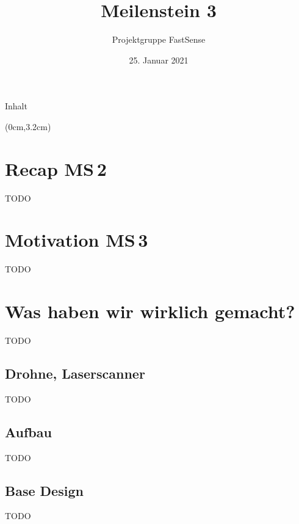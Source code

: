 \documentclass{beamer}
\title{Meilenstein 3}
\author{Projektgruppe FastSense}
\date{25. Januar 2021}
\begin{document}
{
\begin{frame}
\titlepage
\end{frame}}

\begin{frame}{Inhalt}
\tableofcontents
\begin{textblock*}{1cm}(0cm,3.2cm)
\end{textblock*}
\end{frame}

\section{Recap MS\,2}
\begin{frame}{\secname}
TODO
\end{frame}

\section{Motivation MS\,3}
\begin{frame}{\secname}
TODO
\end{frame}

\section{Was haben wir wirklich gemacht?}
\begin{frame}{\secname}
TODO
\end{frame}

\subsection{Drohne, Laserscanner}
\begin{frame}{\subsecname}
TODO
\end{frame}

\subsection{Aufbau}
\begin{frame}{\subsecname}
TODO
\end{frame}

\subsection{Base Design}
\begin{frame}{\subsecname}
TODO
\end{frame}
\end{document}
